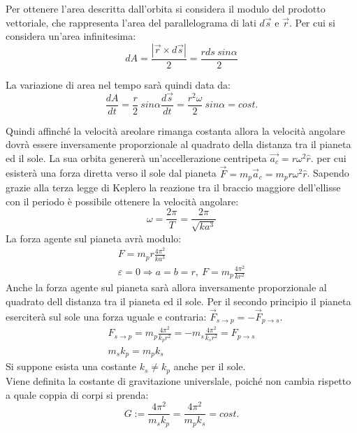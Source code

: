 \documentclass{article}
\numberwithin{equation}{subsection}
\begin{document}
Per ottenere l'area descritta dall'orbita si considera il modulo del prodotto vettoriale, che rappresenta l'area del parallelograma di lati $d\vec{s}$ e 
$\vec{r}$. Per cui si considera un'area infinitesima:
\begin{equation}
    dA=\displaystyle\frac{|\vec{r}\times d\vec{s}|}{2}=\frac{rds\:sin\alpha}{2}
\end{equation}

La variazione di area nel tempo sarà quindi data da:
\begin{equation}
    \displaystyle\frac{dA}{dt}=\frac{r}{2}\:sin\alpha\frac{d\vec{s}}{dt}=\frac{r^2\omega}{2}\:sin\alpha=cost.
\end{equation}

Quindi affinché la velocità areolare rimanga costanta allora la velocità angolare dovrà essere inversamente proporzionale al quadrato della distanza 
tra il pianeta ed il sole. La sua orbita genererà un'accellerazione centripeta $\vec{a_c}=r\omega^2\hat{r}$. per cui esisterà una forza diretta verso 
il sole dal pianeta $\vec{F}=m_p\vec{a}_c=m_pr\omega^2\hat{r}$. Sapendo grazie alla terza legge di Keplero la reazione tra il braccio maggiore
dell'ellisse con il periodo è possibile ottenere la velocità angolare: 
\begin{equation}
    \omega=\displaystyle\frac{2\pi}{T}=\frac{2\pi}{\sqrt{ka^3}}
\end{equation}
La forza agente sul pianeta avrà modulo:
\begin{gather}
    F=m_pr\displaystyle\frac{4\pi^2}{ka^3}\\
    \varepsilon=0\Rightarrow a=b=r,\:F=m_p\displaystyle\frac{4\pi^2}{kr^2}
\end{gather}
Anche la forza agente sul pianeta sarà allora inversamente proporzionale al quadrato dell distanza tra il pianeta ed il sole. Per il secondo 
principio il pianeta eserciterà sul sole una forza uguale e contraria: $\vec{F}_{s\to p}=-\vec{F}_{p\to s}$. 
\begin{gather}
    F_{s\to p}=m_p\displaystyle\frac{4\pi^2}{k_pr^2}=-m_s\displaystyle\frac{4\pi^2}{k_sr^2}=F_{p\to s}\\
    m_sk_p=m_pk_s
\end{gather}
Si suppone esista una costante $k_s\neq k_p$ anche per il sole. \\
Viene definita la costante di gravitazione universlale, poiché non cambia rispetto a quale coppia di corpi si prenda:
\begin{equation}
    G:=\displaystyle\frac{4\pi^2}{m_sk_p}=\frac{4\pi^2}{m_pk_s}=cost.
\end{equation}
\end{document}
